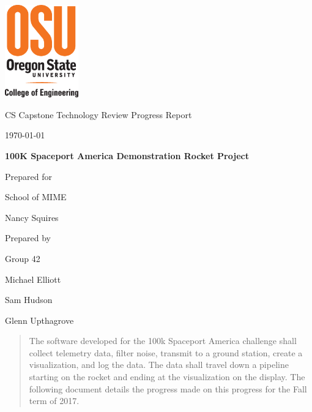 \documentclass[onecolumn, draftclsnofoot,10pt, compsoc]{IEEEtran}
\def \CapstoneTeamName{		100k Challenge CS}
\def \CapstoneTeamNumber{		42}
\def \GroupMemberOne{			Michael Elliott}
\def \GroupMemberTwo{		 	Sam Hudson}
\def \GroupMemberThree{			Glenn Upthagrove}
\def \CapstoneProjectName{		100K Spaceport America Demonstration Rocket Project }
\def \CapstoneSponsorCompany{	School of MIME}
\def \CapstoneSponsorPerson{		Nancy Squires}
\def \DocType{		Technology Review
				Progress Report
				}
\newcommand{\NameSigPair}[1]{\par
\makebox[2.75in][r]{#1} \hfil 	\makebox[3.25in]{\makebox[2.25in]{\hrulefill} \hfill		\makebox[.75in]{\hrulefill}}
\par\vspace{-12pt} \textit{\tiny\noindent
\makebox[2.75in]{} \hfil		\makebox[3.25in]{\makebox[2.25in][r]{Signature} \hfill	\makebox[.75in][r]{Date}}}}
\renewcommand{\NameSigPair}[1]{#1}
\begin{document}
\begin{titlepage}
    \begin{singlespace}
    	\includegraphics[height=4cm]{coe_v_spot1} %
        \hfill 
        \par\vspace{.2in}
        \centering
        \scshape{
            \huge CS Capstone \DocType \par
            {\large\today}\par
            \vspace{.5in}
            \textbf{\Huge\CapstoneProjectName}\par
            \vfill
            {\large Prepared for}\par
            \Huge \CapstoneSponsorCompany\par
            \vspace{5pt}
            {\Large\NameSigPair{\CapstoneSponsorPerson}\par}
            {\large Prepared by }\par
            Group\CapstoneTeamNumber\par
            \vspace{5pt}
            {\Large
                \NameSigPair{\GroupMemberOne}\par
                \NameSigPair{\GroupMemberTwo}\par
                \NameSigPair{\GroupMemberThree}\par
            }
            \vspace{20pt}
        }
        \begin{abstract}
	The software developed for the 100k Spaceport America challenge shall collect telemetry data, filter noise, transmit to a ground station, create a visualization, and log the data. The data shall travel down a pipeline starting on the rocket and ending at the visualization on the display. The following document details the progress made on this progress for the Fall term of 2017. 
        \end{abstract}     
    \end{singlespace}
\end{titlepage}
\newpage
{}
\tableofcontents
\clearpage
\end{document}
